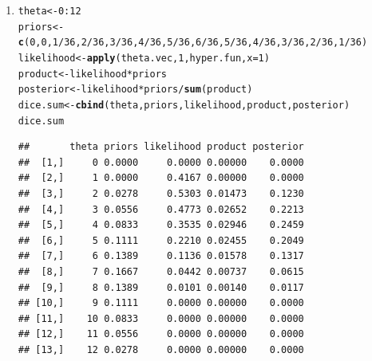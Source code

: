 \documentclass[12pt]{article}\usepackage[]{graphicx}\usepackage[]{color}
\makeatletter
\newcommand{\hlnum}[1]{\textcolor[rgb]{0.686,0.059,0.569}{#1}}%
\newcommand{\hlopt}[1]{\textcolor[rgb]{0,0,0}{#1}}%
\newcommand{\hlstd}[1]{\textcolor[rgb]{0.345,0.345,0.345}{#1}}%
\newcommand{\hlkwb}[1]{\textcolor[rgb]{0.69,0.353,0.396}{#1}}%
\newcommand{\hlkwc}[1]{\textcolor[rgb]{0.333,0.667,0.333}{#1}}%
\newcommand{\hlkwd}[1]{\textcolor[rgb]{0.737,0.353,0.396}{\textbf{#1}}}%
\newenvironment{kframe}{%
 \def\at@end@of@kframe{}%
 \ifinner\ifhmode%
  \def\at@end@of@kframe{\end{minipage}}%
  \begin{minipage}{\columnwidth}%
 \fi\fi%
 \def\FrameCommand##1{\hskip\@totalleftmargin \hskip-\fboxsep
 \colorbox{shadecolor}{##1}\hskip-\fboxsep
     \hskip-\linewidth \hskip-\@totalleftmargin \hskip\columnwidth}%
 \MakeFramed {\advance\hsize-\width
   \@totalleftmargin\z@ \linewidth\hsize
   \@setminipage}}%
 {\par\unskip\endMakeFramed%
 \at@end@of@kframe}
\newenvironment{knitrout}{}{} %
\makeatother
\begin{document}
\begin{doublespacing}
\begin{enumerate}
\begin{enumerate}
\item
\begin{knitrout}\footnotesize
{}\color{fgcolor}\begin{kframe}
\begin{alltt}
\hlstd{theta} \hlkwb{<-} \hlnum{0}\hlopt{:}\hlnum{12}
\hlstd{priors} \hlkwb{<-} \hlkwd{c}\hlstd{(}\hlnum{0}\hlstd{,} \hlnum{0}\hlstd{,} \hlnum{1}\hlopt{/}\hlnum{36}\hlstd{,} \hlnum{2}\hlopt{/}\hlnum{36}\hlstd{,} \hlnum{3}\hlopt{/}\hlnum{36}\hlstd{,} \hlnum{4}\hlopt{/}\hlnum{36}\hlstd{,} \hlnum{5}\hlopt{/}\hlnum{36}\hlstd{,} \hlnum{6}\hlopt{/}\hlnum{36}\hlstd{,} \hlnum{5}\hlopt{/}\hlnum{36}\hlstd{,} \hlnum{4}\hlopt{/}\hlnum{36}\hlstd{,} \hlnum{3}\hlopt{/}\hlnum{36}\hlstd{,} \hlnum{2}\hlopt{/}\hlnum{36}\hlstd{,} \hlnum{1}\hlopt{/}\hlnum{36}\hlstd{)}
\hlstd{likelihood} \hlkwb{<-} \hlkwd{apply}\hlstd{(theta.vec,} \hlnum{1}\hlstd{, hyper.fun,} \hlkwc{x} \hlstd{=} \hlnum{1}\hlstd{)}
\hlstd{product} \hlkwb{<-} \hlstd{likelihood}\hlopt{*}\hlstd{priors}
\hlstd{posterior} \hlkwb{<-} \hlstd{likelihood}\hlopt{*}\hlstd{priors}\hlopt{/}\hlkwd{sum}\hlstd{(product)}
\hlstd{dice.sum} \hlkwb{<-} \hlkwd{cbind}\hlstd{(theta, priors, likelihood, product, posterior)}
\hlstd{dice.sum}
\end{alltt}
\begin{verbatim}
##       theta priors likelihood product posterior
##  [1,]     0 0.0000     0.0000 0.00000    0.0000
##  [2,]     1 0.0000     0.4167 0.00000    0.0000
##  [3,]     2 0.0278     0.5303 0.01473    0.1230
##  [4,]     3 0.0556     0.4773 0.02652    0.2213
##  [5,]     4 0.0833     0.3535 0.02946    0.2459
##  [6,]     5 0.1111     0.2210 0.02455    0.2049
##  [7,]     6 0.1389     0.1136 0.01578    0.1317
##  [8,]     7 0.1667     0.0442 0.00737    0.0615
##  [9,]     8 0.1389     0.0101 0.00140    0.0117
## [10,]     9 0.1111     0.0000 0.00000    0.0000
## [11,]    10 0.0833     0.0000 0.00000    0.0000
## [12,]    11 0.0556     0.0000 0.00000    0.0000
## [13,]    12 0.0278     0.0000 0.00000    0.0000
\end{verbatim}
\end{kframe}
\end{knitrout}


\end{enumerate}
\end{enumerate}
\end{doublespacing}
\end{document}
